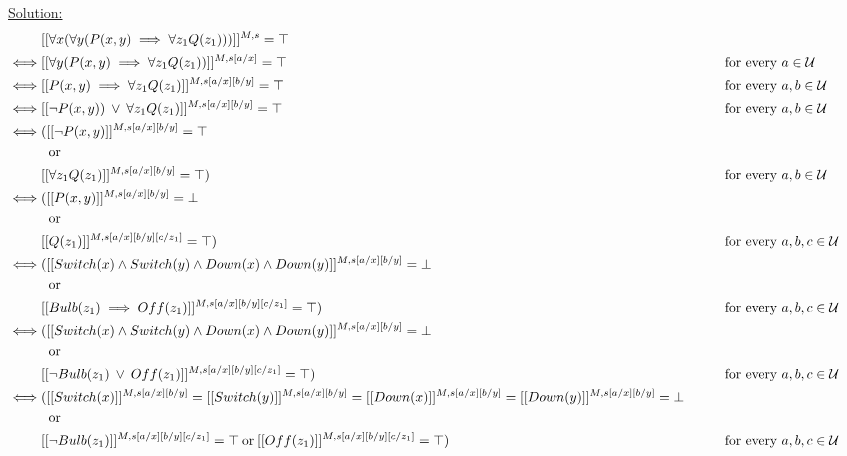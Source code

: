 \documentclass{article}
\begin{document}
\underline{Solution:}
\begin{align*}
  & [[ \forall x (\forall y (P(x,y) \implies \forall z_1 Q(z_1))) ]]^{M, s} = \top
  & &&\\
  \iff& [[ \forall y (P(x,y) \implies \forall z_1 Q(z_1)) ]]^{M, s[a/x]} = \top
  &&\text{\qquad for every $a \in \mathcal{U}$} &&\\
  \iff& [[ P(x,y) \implies \forall z_1 Q(z_1) ]]^{M, s[a/x][b/y]} = \top
  &&\text{\qquad for every $a,b \in \mathcal{U}$} &&\\
  \iff& [[ \lnot P(x,y)) \: \lor \: \forall z_1 Q(z_1) ]]^{M, s[a/x][b/y]} = \top
  &&\text{\qquad for every $a,b \in \mathcal{U}$} &&\\
  \iff& ([[ \lnot P(x,y) ]]^{M, s[a/x][b/y]} = \top &&\\
  &\: \text{ or } \: &&\\
  &[[\forall z_1 Q(z_1) ]]^{M, s[a/x][b/y]} = \top) 
  &&\text{\qquad for every $a,b \in \mathcal{U}$} &&\\
  \iff& ([[ P(x,y) ]]^{M, s[a/x][b/y]} = \bot &&\\
  &\: \text{ or } \: &&\\
  &[[Q(z_1) ]]^{M, s[a/x][b/y][c/z_1]} = \top) 
  &&\text{\qquad for every $a,b,c \in \mathcal{U}$} &&\\
  \iff& ([[ Switch(x) \land Switch(y) \land Down(x) \land Down(y) ]]^{M, s[a/x][b/y]} = \bot &&\\
  & \: \text{ or } \: &&\\
  &[[ Bulb(z_1) \implies Off(z_1) ]]^{M, s[a/x][b/y][c/z_1]} = \top) 
  &&\text{\qquad for every $a,b,c \in \mathcal{U}$} &&\\
  \iff& ([[ Switch(x) \land Switch(y) \land Down(x) \land Down(y) ]]^{M, s[a/x][b/y]} = \bot &&\\
  & \: \text{ or } \: &&\\
  &[[\lnot Bulb(z_1) \: \lor \: Off(z_1)]]^{M, s[a/x][b/y][c/z_1]} = \top) 
  &&\text{\qquad for every $a,b,c \in \mathcal{U}$} &&\\
  \iff& ([[ Switch(x)]]^{M, s[a/x][b/y]} 
  = [[Switch(y)]]^{M, s[a/x][b/y]} 
  = [[Down(x)]]^{M, s[a/x][b/y]} 
  = [[Down(y) ]]^{M, s[a/x][b/y]} = \bot &&\\
  & \: \text{ or } \: &&\\
  &[[\lnot Bulb(z_1)]]^{M, s[a/x][b/y][c/z_1]} = \top \: \text{or} \: [[Off(z_1)]]^{M, s[a/x][b/y][c/z_1]} = \top) 
  &&\text{\qquad for every $a,b,c \in \mathcal{U}$} &&\\

\end{align*}
\end{document}
